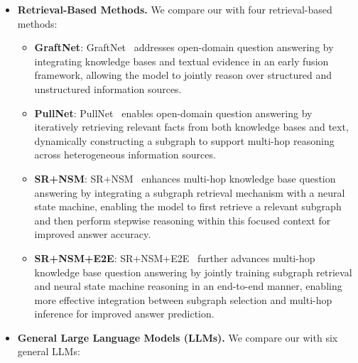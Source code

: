 \begin{itemize}
\begin{itemize}
\end{itemize}

\item \textbf{Retrieval-Based Methods.} We compare our \method{} with four retrieval-based methods:

\begin{itemize}
    \item \textbf{GraftNet}: GraftNet~\cite{sun2018open} addresses open-domain question answering by integrating knowledge bases and textual evidence in an early fusion framework, allowing the model to jointly reason over structured and unstructured information sources.
    \item \textbf{PullNet}: PullNet~\cite{sun2019pullnet} enables open-domain question answering by iteratively retrieving relevant facts from both knowledge bases and text, dynamically constructing a subgraph to support multi-hop reasoning across heterogeneous information sources.
    \item \textbf{SR+NSM}: SR+NSM~\cite{zhang2022subgraph} enhances multi-hop knowledge base question answering by integrating a subgraph retrieval mechanism with a neural state machine, enabling the model to first retrieve a relevant subgraph and then perform stepwise reasoning within this focused context for improved answer accuracy.
    \item \textbf{SR+NSM+E2E}: SR+NSM+E2E~\cite{zhang2022subgraph} further advances multi-hop knowledge base question answering by jointly training subgraph retrieval and neural state machine reasoning in an end-to-end manner, enabling more effective integration between subgraph selection and multi-hop inference for improved answer prediction.
\end{itemize}


    \item  \textbf{General
Large Language Models (LLMs).} We compare our \method{} with six general
LLMs:

\begin{itemize}


\end{itemize}
\end{itemize}
